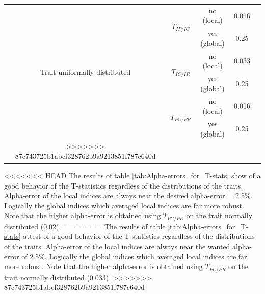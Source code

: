 \documentclass[12pt]{article}\usepackage[]{graphicx}\usepackage[]{color}
\begin{document}
\begin{landscape}
\begin{table}[h!]
\begin{center}
\begin{tabular}{|c|c|c|c|c|}
\hline \hline \hline

\multirow{6}{*}{Trait uniformally distributed} & \multirow{2}{*}{$T_{IP/IC}$} & no (local) & 0.016 \tabularnewline
\cline{3-4}
 & & yes (global) &  0.25 \tabularnewline
\cline{2-4} 
 & \multirow{2}{*}{$T_{IC/IR}$} & no (local) & 0.033 \tabularnewline
\cline{3-4} 
 & & yes (global) &  0.25 \tabularnewline
\cline{2-4} 
 & \multirow{2}{*}{$T_{PC/PR}$} & no (local) & 0.016 \tabularnewline
\cline{3-4} 
 & & yes (global)&  0.25 \tabularnewline
>>>>>>> 87c743725b1abcf328762b9a9213851f787c640d
\hline 
\end{tabular}
\end{center}
\end{table}



<<<<<<< HEAD
The results of table \ref{tab:Alpha-errors_for_T-stats} show of a good behavior of the T-statistics regardless of the distributions of the traits. Alpha-error of the local indices are always near the desired alpha-error = 2.5\%. Logically the global indices which averaged local indices are far more robust. Note that the higher alpha-error is obtained using $T_{PC/PR}$ on the trait normally distributed (0.02).
=======
The results of table \ref{tab:Alpha-errors_for_T-stats} attest of a good behavior of the T-statistics regardless of the distributions of the traits. Alpha-error of the local indices are always near the wanted alpha-error of 2.5\%. Logically the global indices which averaged local indices are far more robust. Note that the higher alpha-error is obtained using $T_{PC/PR}$ on the trait normally distributed (0.033).
>>>>>>> 87c743725b1abcf328762b9a9213851f787c640d
















































\end{landscape}
\end{document}
